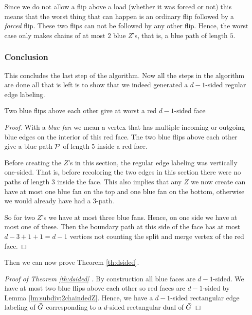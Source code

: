   Since we do not allow a flip above a load (whether it was forced or not) this means that the worst thing that can happen is an ordinary flip followed by a \emph{forced} flip. These two flips can not be followed by any other flip. Hence, the worst case only makes chains of at most $2$ blue $Z$'s, that is, a blue path of length $5$.

\subsubsection{Conclusion}
  This concludes the last step of the algorithm.
  Now all the steps in the algorithm are done all that is left is to show that we indeed generated a $d-1$-sided regular edge labeling.
  \begin{lemma}
    \label{lm:subdiv:2chaindedZ}
    Two blue flips above each other give at worst a red $d-1$-sided face
  \end{lemma}
  \begin{proof}
    With a \emph{blue fan} we mean a vertex that has multiple incoming or outgoing blue edges on the interior of this red face.
    The two blue flips above each other give a blue path $\P$ of length $5$ inside a red face.

    Before creating the $Z$'s in this section, the regular edge labeling was vertically one-sided.
    That is, before recoloring the two edges in this section there were no paths of length $3$ inside the face.
    This also implies that any $Z$ we now create can have at most one blue fan on the top and one blue fan on the bottom, otherwise we would already have had a $3$-path.

    So for two $Z$'s we have at most three blue fans.
    Hence, on one side we have at most one of these.
    Then the boundary path at this side of the face has at most $d-3 + 1 +1 =d-1$ vertices not counting the split and merge vertex of the red face.
  \end{proof}

    Then we can now prove Theorem \ref{th:dsided}.

  \begin{proof}[Proof of Theorem \ref{th:dsided} ]
    By construction all blue faces are $d-1$-sided. We have at most two blue flips above each other so red faces are $d-1$-sided by Lemma \ref{lm:subdiv:2chaindedZ}. Hence, we have a $d-1$-sided rectangular edge labeling of $\ext G$ corresponding to a $d$-sided rectangular dual of $\ext G$
  \end{proof}
